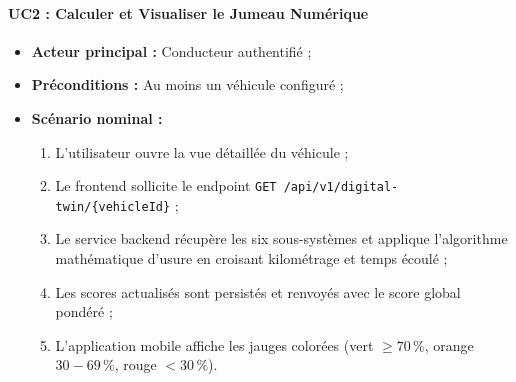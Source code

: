 \documentclass[12pt,a4paper,oneside]{report}
\newcommand{\bpuce}{\textcolor{midBlue}{$\blacktriangleright$}\;}
\begin{document}
\paragraph{UC2 : Calculer et Visualiser le Jumeau Num\'erique}
\begin{itemize}[label=\bpuce]
  \item \textbf{Acteur principal :} Conducteur authentifi\'e ;
  \item \textbf{Pr\'econditions :} Au moins un v\'ehicule configur\'e ;
  \item \textbf{Sc\'enario nominal :}
    \begin{enumerate}
      \item L'utilisateur ouvre la vue d\'etaill\'ee du v\'ehicule ;
      \item Le frontend sollicite le endpoint \texttt{GET /api/v1/digital-twin/\{vehicleId\}} ;
      \item Le service backend r\'ecup\`ere les six sous-syst\`emes et applique l'algorithme math\'ematique d'usure en croisant kilom\'etrage et temps \'ecoul\'e ;
      \item Les scores actualis\'es sont persist\'es et renvoy\'es avec le score global pond\'er\'e ;
      \item L'application mobile affiche les jauges color\'ees (vert $\ge 70\,\%$, orange $30-69\,\%$, rouge $< 30\,\%$).
    \end{enumerate}
\end{itemize}
\end{document}
